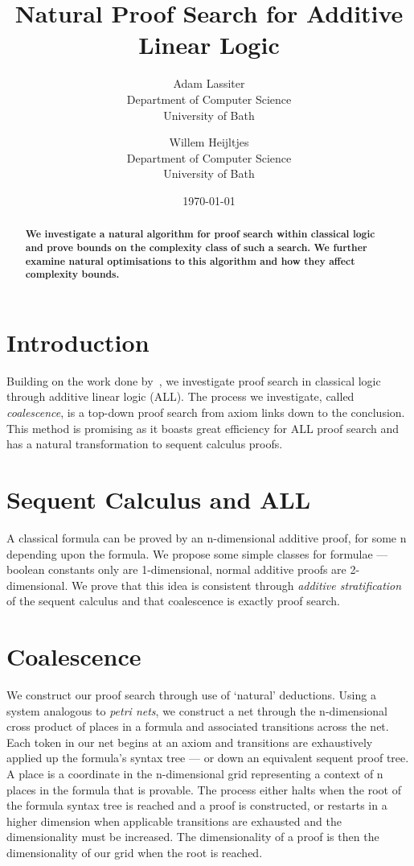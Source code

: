 \documentclass{article}
\title{Natural Proof Search for Additive Linear Logic}
\author{Adam Lassiter\\Department of Computer Science\\University of Bath \and Willem Heijltjes\\Department of Computer Science\\University of Bath}
\date{\today}
\theoremstyle{indented}
\begin{document}
    \maketitle
    \begin{abstract}
        \textbf{
            We investigate a natural algorithm for proof search within classical logic and prove bounds on the complexity class of such a search.
            We further examine natural optimisations to this algorithm and how they affect complexity bounds.
        }
    \end{abstract}

    \section*{Introduction}
        Building on the work done by~\cite{petri-nets}, we investigate proof search in classical logic through additive linear logic (ALL).
        The process we investigate, called \textit{coalescence}, is a top-down proof search from axiom links down to the conclusion.
        This method is promising as it boasts great efficiency for ALL proof search and has a natural transformation to sequent calculus proofs.

    \section*{Sequent Calculus and ALL}
        A classical formula can be proved by an n-dimensional additive proof, for some n depending upon the formula.
        We propose some simple classes for formulae --- boolean constants only are 1-dimensional, normal additive proofs are 2-dimensional.
        We prove that this idea is consistent through \textit{additive stratification} of the sequent calculus and that coalescence is exactly proof search.

    \section*{Coalescence}
        We construct our proof search through use of `natural' deductions.
        Using a system analogous to \textit{petri nets}, we construct a net through the n-dimensional cross product of places in a formula and associated transitions across the net.
        Each token in our net begins at an axiom and transitions are exhaustively applied up the formula's syntax tree --- or down an equivalent sequent proof tree.
        A place is a coordinate in the n-dimensional grid representing a context of n places in the formula that is provable.
        The process either halts when the root of the formula syntax tree is reached and a proof is constructed, or restarts in a higher dimension when applicable transitions are exhausted and the dimensionality must be increased.
        The dimensionality of a proof is then the dimensionality of our grid when the root is reached.
\end{document}

